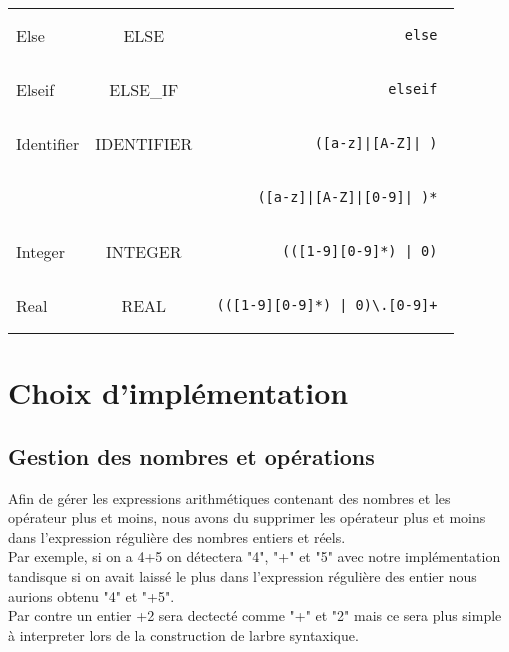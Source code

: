 \documentclass[a4paper,10pt]{article}
\begin{document}
\begin{tabular}{|l|c|r|}
Else & ELSE & \begin{minipage}{2in} \begin{verbatim} else \end{verbatim} \end{minipage} \\
Elseif & ELSE\_IF & \begin{minipage}{2in} \begin{verbatim} elseif \end{verbatim} \end{minipage} \\
Identifier & IDENTIFIER & \begin{minipage}{2in} \begin{verbatim} ([a-z]|[A-Z]|_) \end{verbatim} \end{minipage} \\
 &  & \begin{minipage}{2in} \begin{verbatim} ([a-z]|[A-Z]|[0-9]|_)* \end{verbatim} \end{minipage} \\
Integer & INTEGER & \begin{minipage}{2in} \begin{verbatim} (([1-9][0-9]*) | 0) \end{verbatim} \end{minipage} \\
Real & REAL & \begin{minipage}{2in} \begin{verbatim} (([1-9][0-9]*) | 0)\.[0-9]+ \end{verbatim} \end{minipage} \\
  \hline
\end{tabular}

\section{Choix d'implémentation}

\subsection{Gestion des nombres et opérations}

Afin de gérer les expressions arithmétiques contenant des nombres et les opérateur plus et moins, nous avons du supprimer les opérateur plus et moins dans l'expression régulière des nombres entiers et réels.\\
Par exemple, si on a 4+5 on détectera "4", "+" et "5" avec notre implémentation tandisque si on avait laissé le plus dans l'expression régulière des entier nous aurions obtenu "4" et "+5".\\
Par contre un entier +2 sera dectecté comme "+" et "2" mais ce sera plus simple à interpreter lors de la construction de larbre syntaxique.
\end{document}
